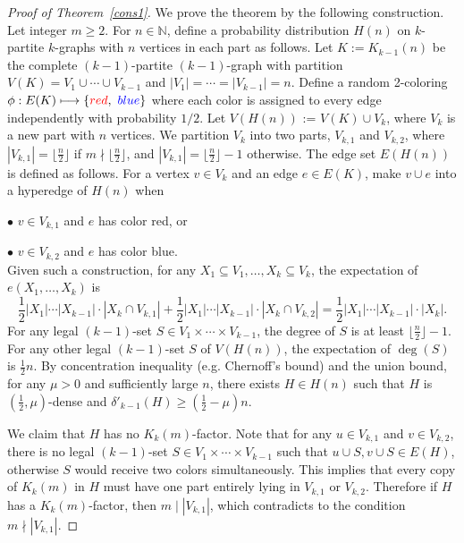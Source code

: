 \documentclass[11pt,a4paper]{article}
\theoremstyle{definition}
\begin{document}
\begin{proof}[Proof of Theorem~\ref{cons1}]
    We prove the theorem by the following construction.
    Let integer $m\geq 2$. For $n\in \mathbb{N}$, define a probability distribution $H(n)$ on $k$-partite $k$-graphs with $n$ vertices in each part as follows. Let $K:= K_{k-1}(n)$ be the complete $(k-1)$-partite $(k-1)$-graph with partition $V(K)=V_1\cup \cdots \cup V_{k-1}$ and $|V_1|=\cdots =|V_{k-1}|=n$. Define a random 2-coloring $\phi:E(K)\longmapsto \{{\color {red}red},~{\color{blue}blue}\}$ where each color is assigned to every edge independently with probability $1/2$. Let $V(H(n))$ := $V(K)\cup V_k$, where $V_k$ is a new part with $n$ vertices. We partition $V_k$ into two parts, $V_{k,1}$ and $V_{k,2}$, where $|V_{k,1}|=\lfloor \frac{n}{2} \rfloor$ if $m \nmid \lfloor \frac{n}{2} \rfloor$, and  $|V_{k,1}|=\lfloor \frac{n}{2} \rfloor-1$ otherwise. The edge set $E(H(n))$ is defined as follows. For a vertex $v\in V_k$ and an edge $e\in E(K)$, make $v\cup e$ into a hyperedge of $H(n)$ when
    
    $\bullet$ $v\in V_{k,1}$ and $e$ has color {\color{red}red}, or

    $\bullet$ $v\in V_{k,2}$ and $e$ has color {\color{blue}blue}.
    ~\\

    Given such a construction, for any $X_1\subseteq V_1, \dots ,X_k\subseteq V_k$, the expectation of $e(X_1,\dots ,X_k)$ is $$\frac{1}{2}|X_1|\cdots|X_{k-1}|\cdot|X_k\cap V_{k,1}|+\frac{1}{2}|X_1|\cdots |X_{k-1}|\cdot|X_k\cap V_{k,2}|=\frac{1}{2}|X_1|\cdots|X_{k-1}|\cdot|X_k|.$$ For any legal $(k-1)$-set $S\in V_1\times \cdots \times V_{k-1}$, the degree of $S$ is at least $\lfloor \frac{n}{2} \rfloor-1$. For any other legal $(k-1)$-set $S$ of $V(H(n))$, the expectation of $\deg (S)$ is $\frac{1}{2}n$. By concentration inequality (e.g. Chernoff's bound) and the union bound, for any $\mu >0$ and sufficiently large $n$, there exists $H\in H(n)$ such that $H$ is $(\frac{1}{2},\mu)$-dense and $\delta'_{k-1}(H)\geq (\frac{1}{2}-\mu)n$.

    We claim that $H$ has no $K_k(m)$-factor. Note that for any $u\in V_{k,1}$ and $v\in V_{k,2}$, there is no legal $(k-1)$-set $S\in V_1\times \cdots \times V_{k-1}$ such that $u\cup S, v\cup S \in E(H)$, otherwise $S$ would receive two colors simultaneously. This implies that every copy of $K_k(m)$ in $H$ must have one part entirely lying in $V_{k,1}$ or $V_{k,2}$. Therefore if $H$ has a $K_k(m)$-factor, then $m\mid |V_{k,1}|$, which contradicts to the condition $m \nmid |V_{k,1}|$.
    


\end{proof}
\end{document}
